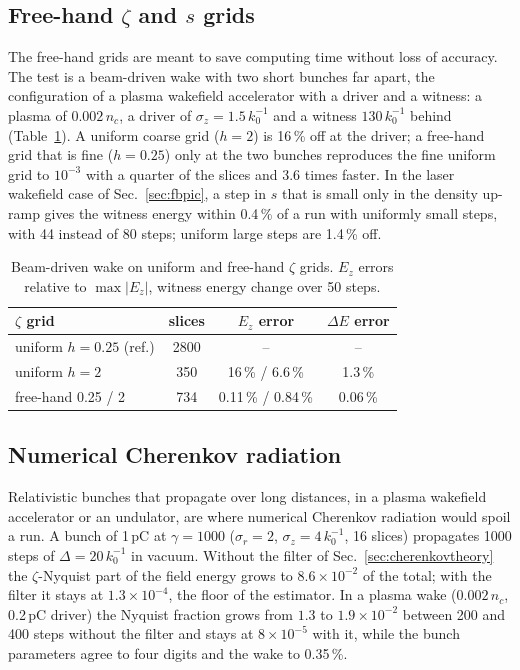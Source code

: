 \documentclass[aps,prab,reprint,floatfix,superscriptaddress,amsmath,amssymb]{revtex4-2}
\begin{document}
\subsection{Free-hand $\zeta$ and $s$ grids}

The free-hand grids are meant to save computing time without loss of accuracy. The test is a beam-driven wake with two short bunches far apart, the configuration of a plasma wakefield accelerator with a driver and a witness: a plasma of $0.002\,n_c$, a driver of $\sigma_z = 1.5\,k_0^{-1}$ and a witness $130\,k_0^{-1}$ behind (Table~\ref{tab:zgrid}). A uniform coarse grid ($h = 2$) is 16\,\% off at the driver; a free-hand grid that is fine ($h = 0.25$) only at the two bunches reproduces the fine uniform grid to $10^{-3}$ with a quarter of the slices and 3.6 times faster. In the laser wakefield case of Sec.~\ref{sec:fbpic}, a step in $s$ that is small only in the density up-ramp gives the witness energy within 0.4\,\% of a run with uniformly small steps, with 44 instead of 80 steps; uniform large steps are 1.4\,\% off.

\begin{table}[htb]
\caption{Beam-driven wake on uniform and free-hand $\zeta$ grids. $E_z$ errors relative to $\max|E_z|$, witness energy change over 50 steps.}\label{tab:zgrid}
\begin{ruledtabular}
\begin{tabular}{lccc}
$\zeta$ grid & slices & $E_z$ error\footnotemark[1] & $\Delta E$ error \\ \hline
uniform $h = 0.25$ (ref.) & 2800 & -- & -- \\
uniform $h = 2$ & 350 & 16\,\% / 6.6\,\% & 1.3\,\% \\
free-hand 0.25 / 2 & 734 & 0.11\,\% / 0.84\,\% & 0.06\,\% \\
\end{tabular}
\end{ruledtabular}
\end{table}

\subsection{Numerical Cherenkov radiation}\label{sec:cherenkov}

Relativistic bunches that propagate over long distances, in a plasma wakefield accelerator or an undulator, are where numerical Cherenkov radiation would spoil a run. A bunch of 1\,pC at $\gamma = 1000$ ($\sigma_r = 2$, $\sigma_z = 4\,k_0^{-1}$, 16 slices) propagates 1000 steps of $\Delta = 20\,k_0^{-1}$ in vacuum. Without the filter of Sec.~\ref{sec:cherenkovtheory} the $\zeta$-Nyquist part of the field energy grows to $8.6\times10^{-2}$ of the total; with the filter it stays at $1.3\times10^{-4}$, the floor of the estimator. In a plasma wake ($0.002\,n_c$, 0.2\,pC driver) the Nyquist fraction grows from $1.3$ to $1.9\times10^{-2}$ between 200 and 400 steps without the filter and stays at $8\times10^{-5}$ with it, while the bunch parameters agree to four digits and the wake to 0.35\,\%.
\end{document}
